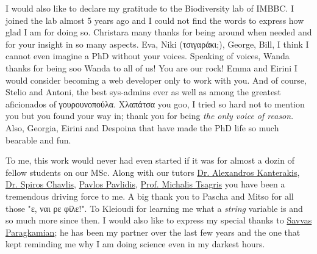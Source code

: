 \documentclass[master=elt, cleveref, autoref, masteroption=eg]{kulemt}
\begin{document}
\begin{preface}
   I would also like to declare my gratitude to the Biodiversity lab of IMBBC. 
   I joined the lab almost 5 years ago and I could not find the words to express how glad I am for doing so.
   Christara many thanks for being around when needed and for your insight in so many aspects.
   Eva, Niki (\foreignlanguage{greek}{τσιγαράκι};), George, Bill, I think I cannot even imagine a PhD without your voices. 
   Speaking of voices, Wanda thanks for being soo Wanda to all of us! 
   You are our rock!
   Emma and Eirini I would consider becoming a web developer only to work with you. 
   And of course, 
   Stelio and Antoni, the best sys-admins ever as well as among the greatest aficionados of \foreignlanguage{greek}{γουρουνοπούλα}.
   \foreignlanguage{greek}{Χλαπάτσα} you goo, I tried so hard not to mention you but you found your way in;
   thank you for being \textit{the only voice of reason}.
   Also, Georgia, Eirini and Despoina that have made the PhD life so much bearable and fun. 

   To me, this work would never had even started if it was for almost a dozin of fellow students on our MSc. 
   Along with our tutors 
   \href{https://www.ics.forth.gr/cbml/person/kanterakis/alexandros%C2%A0}{Dr. Alexandros Kanterakis}, 
   \href{https://scholar.google.com/citations?user=HNOIZrAAAAAJ&hl=en}{Dr. Spiros Chavlis}, 
   \href{http://pop-gen.eu/wordpress/}{Pavlos Pavlidis}, 
   \href{https://economics.soc.uoc.gr/en/staff/37351/17}{Prof. Michalis Tsagris} 
   you have been a tremendous driving force to me. 
   A big thank you to
   Pascha and Mitso for all those "\foreignlanguage{greek}{ε, ναι ρε φίλε!}". 
   To Kleioudi for learning me what a \textit{string} variable is and so much more since then.
   I would also like to express my special thanks to \href{https://www.researchgate.net/profile/Savvas-Paragkamian-2}{Savvas Paragkamian};
   he has been my partner over the last few years and the one that 
   kept reminding me why I am doing science even in my darkest hours. 


\end{preface}
\end{document}
